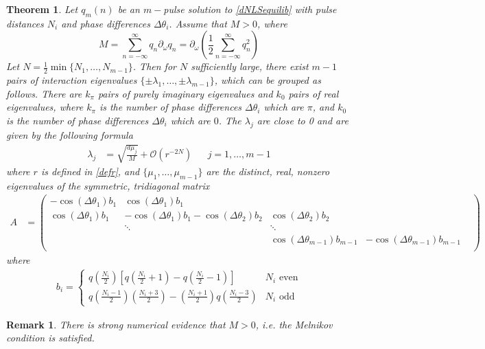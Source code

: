 \documentclass[12pt]{article}
\newtheorem{theorem}{Theorem}
\newtheorem{remark}{Remark}
\begin{document}
\begin{theorem}\label{dNLSeigtheorem}
Let $q_m(n)$ be an $m-$pulse solution to \eqref{dNLSequilib} with pulse distances $N_i$ and phase differences $\Delta\theta_i$. Assume that $M > 0$, where
\[
M = \sum_{n=-\infty}^\infty q_n \partial_\omega q_n = \partial_\omega \left( \frac{1}{2} \sum_{n=-\infty}^\infty q_n^2 \right)
\]
Let $N = \frac{1}{2} \min\{ N_1, \dots, N_{m-1}\}$. Then for $N$ sufficiently large, there exist $m-1$ pairs of interaction eigenvalues $\{\pm \lambda_1, \dots, \pm \lambda_{m-1}\}$, which can be grouped as follows. There are $k_\pi$ pairs of purely imaginary eigenvalues and $k_0$ pairs of real eigenvalues, where $k_\pi$ is the number of phase differences $\Delta\theta_i$ which are $\pi$, and $k_0$ is the number of phase differences $\Delta\theta_i$ which are $0$. The $\lambda_j$ are close to 0 and are given by the following formula
\begin{align}\label{eigsDNLS}
\lambda_j &= \sqrt{\frac{d \mu_j}{M}} + \mathcal{O}(r^{-2N}) && j = 1, \dots, m-1
\end{align}
where $r$ is defined in \eqref{defr}, and $\{ \mu_1, \dots, \mu_{m-1} \}$ are the distinct, real, nonzero eigenvalues of the symmetric, tridiagonal matrix
\begin{align}\label{dNLSmatrixA}
A &= \begin{pmatrix}
-\cos(\Delta\theta_1) b_1 & \cos(\Delta\theta_1) b_1 & & &  \\
\cos(\Delta\theta_1) b_1 & -\cos(\Delta\theta_1) b_1 - \cos(\Delta\theta_2) b_2 & \cos(\Delta\theta_2) b_2 \\
& \ddots & \ddots \\
& &  \cos(\Delta\theta_{m-1}) b_{m-1} & -\cos(\Delta\theta_{m-1}) b_{m-1}  \\
\end{pmatrix}
\end{align}
where
\begin{align}\label{bieq}
b_i = \begin{cases}
q\left(\frac{N_i}{2}\right) \left[ q\left(\frac{N_i}{2} + 1\right) - q\left(\frac{N_i}{2} - 1\right) \right] & N_i \text{ even} \\
q\left(\frac{N_i-1}{2}\right)\left(\frac{N_i+3}{2}\right) 
- \left(\frac{N_i+1}{2}\right)q\left(\frac{N_i-3}{2}\right) & N_i \text{ odd}
\end{cases}
\end{align}
\end{theorem}

\begin{remark}
There is strong numerical evidence that $M > 0$, i.e. the Melnikov condition is satisfied.
\end{remark}
\end{document}
